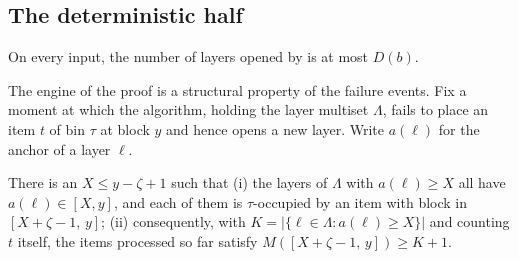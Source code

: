 \subsection{The deterministic half}

\begin{proposition}
\label{prop:det}
On every input, the number of layers opened by  is at
most $D(b)$.
\end{proposition}

The engine of the proof is a structural property of the failure events. Fix
a moment at which the algorithm, holding the layer multiset $\Lambda$, fails
to place an item $t$ of bin $\tau$ at block $y$ and hence opens a new layer.
Write $a(\ell)$ for the anchor of a layer $\ell$.

\begin{claim}
\label{claim:blocking}
There is an $X \le y - \zeta + 1$ such that (i) the layers of $\Lambda$
with $a(\ell) \ge X$ all have $a(\ell) \in [X, y]$, and each of them is
$\tau$-occupied by an item with block in $[X+\zeta-1,\, y]$; (ii)
consequently, with $K = |\{\ell \in \Lambda : a(\ell) \ge X\}|$ and counting
$t$ itself, the items processed so far satisfy
$M([X+\zeta-1,\, y]) \ge K + 1$.
\end{claim}

